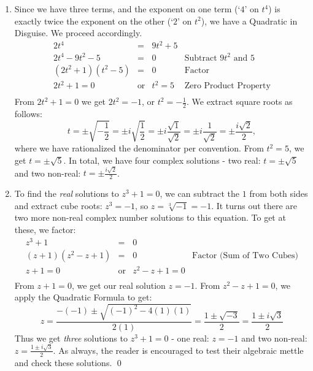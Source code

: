 \documentclass{ximera}
\begin{document}
\begin{example}
\begin{enumerate}
We get two answers: $x = -1 + i\sqrt{2}$ and its conjugate $x = -1 - i\sqrt{2}$.  Checking both of these answers reviews all of the salient points about complex number arithmetic and is therefore strongly encouraged.

\item  Since we have three terms, and the exponent on one term (`$4$' on $t^4$) is exactly twice the exponent on the other (`$2$' on $t^2$), we have a Quadratic in Disguise.  We proceed accordingly.\[ \begin{array}{rclr}

2t^4 & = & 9t^2 + 5 & \\

2t^4 - 9t^2 - 5 & = & 0 & \text{Subtract $9t^2$ and $5$} \\
(2t^2 + 1)(t^2 - 5) & = & 0 & \text{Factor} \\
2t^2 + 1 = 0 & \text{or} & t^2 = 5 & \text{Zero Product Property} \\
\end{array}\]  From $2t^2 + 1 = 0$ we get $2t^2 = -1$, or $t^2 = -\frac{1}{2}$.  We extract square roots as follows: \[ t = \pm \sqrt{-\frac{1}{2}} = \pm i \sqrt{\frac{1}{2}} = \pm i \frac{\sqrt{1}}{\sqrt{2}} = \pm i \frac{1}{\sqrt{2}} = \pm \frac{i \sqrt{2}}{2},\]
where we have rationalized the denominator per convention.  From $t^2 = 5$, we get $t = \pm \sqrt{5}$. In total, we have four complex solutions - two real: $t = \pm \sqrt{5}$ and two non-real: $t = \pm \frac{i \sqrt{2}}{2}$.

\item To find  the \textit{real} solutions to  $z^3 + 1 = 0$, we can subtract the $1$ from both sides and extract cube roots: $z^3 = -1$, so $z  = \sqrt[3]{-1} = -1$.  It turns out there are two more non-real complex number solutions to this equation.  To get at these, we factor:\[ \begin{array}{rclr}

z ^ 3 + 1 & = & 0 & \\
(z + 1)(z^2 - z + 1) & = & 0 & \text{Factor (Sum of Two Cubes)} \\
z + 1 = 0 & \text{or} & z^2 - z + 1 = 0 & \\
\end{array} \] From $z+1 = 0$, we get our real solution $z = -1$.  From $z^2 -z + 1 = 0$, we apply the Quadratic Formula to get: \[z = \frac{-(-1) \pm \sqrt{(-1)^2 - 4(1)(1)}}{2(1)} = \frac{1 \pm \sqrt{-3}}{2} = \frac{1 \pm i\sqrt{3}}{2} \]
Thus we get \textit{three} solutions to $z^3 + 1 = 0$ - one real: $z = -1$ and two non-real: $z =  \frac{1 \pm i\sqrt{3}}{2}$.  As always, the reader is encouraged to test their algebraic mettle and check these solutions. \qed
		
\end{enumerate}


\end{example}
\end{document}
